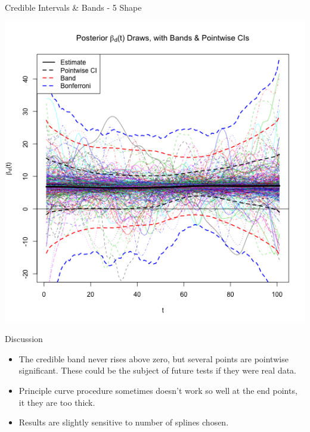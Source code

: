 \documentclass[9 pt]{beamer}
\newcommand{\bi}{\begin{itemize}}
\newcommand{\ei}{\end{itemize}}
\begin{document}
\begin{frame}{Credible Intervals \& Bands - 5 Shape}

\begin{center}

\includegraphics[scale=.37]{pics/Figure_Bands_5_Shape_12-19-12_bonf.png}

\end{center}
\end{frame}


\begin{frame}{Discussion}
\bi
\item The credible band never rises above zero, but several points are pointwise significant. These could be the subject of future tests if they were real data. \vspace{.4cm}
\item Principle curve procedure sometimes doesn't work so well at the end points, it they are too thick.
\item Results are slightly sensitive to number of splines chosen.
\ei
\end{frame}
\end{document}
